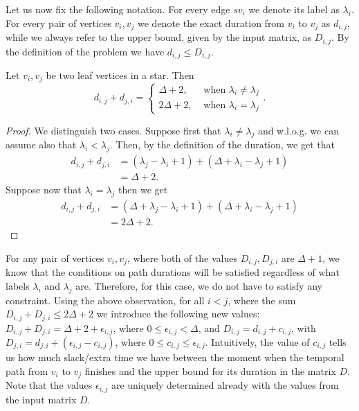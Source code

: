 \documentclass[a4paper,UKenglish,cleveref, autoref, thm-restate]{lipics-v2021}
\begin{document}
Let us now fix the following notation.
For every edge $sv_i$ we denote its label as $\lambda_i$.
For every pair of vertices $v_i, v_j$ we denote the exact duration from $v_i$ to $v_j$ as $d_{i,j}$, while we always refer to the upper bound, given by the input matrix, as $D_{i,j}$.
By the definition of the problem we have $d_{i,j} \leq D_{i,j}$.
\begin{observation}
Let $v_i,v_j$ be two leaf vertices in a star.
Then
\begin{equation}
    d_{i,j} + d_{j,i} =
    \begin{cases}
    \Delta + 2, &\text{ when $\lambda_i \neq \lambda_j$} \\
    2 \Delta + 2, &\text{ when $\lambda_i = \lambda_j$}
    \end{cases}.
\end{equation}
\end{observation}
\begin{proof}
    We distinguish two cases. Suppose first that $\lambda_i \neq \lambda_j$ and w.l.o.g. we can assume also that $\lambda_i < \lambda_j$.
    Then, by the definition of the duration, we get that
    \begin{align*}
        d_{i,j} + d_{j,i} &= (\lambda_j - \lambda_i + 1) + (\Delta + \lambda_i - \lambda_j + 1) \\
        &= \Delta + 2.
    \end{align*}
    Suppose now that $\lambda_i = \lambda_j$ then we get
    \begin{align*}
        d_{i,j} + d_{j,i} &= (\Delta + \lambda_j - \lambda_i + 1) + (\Delta + \lambda_i - \lambda_j + 1) \\
        &= 2\Delta + 2.
    \end{align*}
\end{proof}
For any pair of vertices $v_i,v_j$, where both of the values $D_{i,j}, D_{j,i}$ are $\Delta + 1$, we know that the conditions on path durations will be satisfied regardless of what labels $\lambda_i$ and $\lambda_j$ are. Therefore, for this case, we do not have to satisfy any constraint.
Using the above observation, for all $i < j$, where the sum $D_{i,j} + D_{j,i} \leq 2\Delta + 2$ we introduce the following new values:
$D_{i,j} + D_{j,i} = \Delta + 2 + \epsilon_{i,j}$, where $0 \leq \epsilon_{i,j} < \Delta $,
and 
$D_{i,j} = d_{i,j} + c_{i,j}$, with $D_{j,i} = d_{j,i} + (\epsilon_{i,j} - c_{i,j})$, where 
$0 \leq c_{i,j} \leq \epsilon_{i,j}$.
Intuitively, the value of $c_{i,j}$ tells us how much slack/extra time we have between the moment when the temporal path from $v_i$ to $v_j$ finishes and the upper bound for its duration in the matrix $D$.
Note that the values $\epsilon_{i,j}$ are uniquely determined already with the values from the input matrix $D$.
\end{document}

